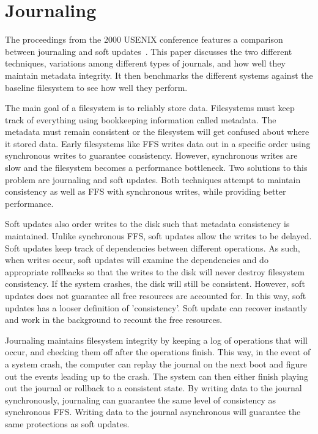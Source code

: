 \section{Journaling}

The proceedings from the 2000 USENIX conference features a comparison
between journaling and soft updates~\cite{seltzer00journaling}. This
paper discusses the two different techniques, variations among
different types of journals, and how well they maintain metadata
integrity. It then benchmarks the different systems against the
baseline filesystem to see how well they perform.

The main goal of a filesystem is to reliably store data. Filesystems
must keep track of everything using bookkeeping information called
metadata. The metadata must remain consistent or the filesystem will
get confused about where it stored data. Early filesystems like FFS
writes data out in a specific order using synchronous writes to
guarantee consistency. However, synchronous writes are slow and the
filesystem becomes a performance bottleneck. Two solutions to this
problem are journaling and soft updates. Both techniques attempt to
maintain consistency as well as FFS with synchronous writes, while
providing better performance.

Soft updates also order writes to the disk such that metadata
consistency is maintained. Unlike synchronous FFS, soft updates allow
the writes to be delayed.  Soft updates keep track of dependencies
between different operations. As such, when writes occur, soft updates
will examine the dependencies and do appropriate rollbacks so that the
writes to the disk will never destroy filesystem consistency. If the
system crashes, the disk will still be consistent. However, soft
updates does not guarantee all free resources are accounted for. In
this way, soft updates has a looser definition of 'consistency'. Soft
update can recover instantly and work in the background to recount the
free resources.

Journaling maintains filesystem integrity by keeping a log of
operations that will occur, and checking them off after the operations
finish. This way, in the event of a system crash, the computer can
replay the journal on the next boot and figure out the events leading
up to the crash. The system can then either finish playing out the
journal or rollback to a consistent state. By writing data to the
journal synchronously, journaling can guarantee the same level of
consistency as synchronous FFS. Writing data to the journal
asynchronous will guarantee the same protections as soft updates.

